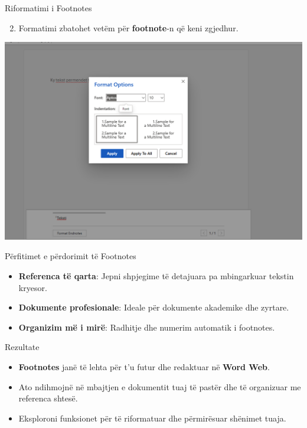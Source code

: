 \documentclass[
  ignorenonframetext,
]{beamer}
\providecommand{\tightlist}{%
  \setlength{\itemsep}{0pt}\setlength{\parskip}{0pt}}
\begin{document}
\begin{frame}{Riformatimi i Footnotes}
\label{riformatimi-i-footnotes-1}
\begin{enumerate}
\setcounter{enumi}{1}
\tightlist
\item
  Formatimi zbatohet vetëm për \textbf{footnote}-n që keni zgjedhur.
\end{enumerate}

\includegraphics{./images/word15.png}
\end{frame}

\begin{frame}{Përfitimet e përdorimit të Footnotes}
\label{puxebrfitimet-e-puxebrdorimit-tuxeb-footnotes}
\begin{itemize}
\item
  \textbf{Referenca të qarta}: Jepni shpjegime të detajuara pa
  mbingarkuar tekstin kryesor.
\item
  \textbf{Dokumente profesionale}: Ideale për dokumente akademike dhe
  zyrtare.
\item
  \textbf{Organizim më i mirë}: Radhitje dhe numerim automatik i
  footnotes.
\end{itemize}
\end{frame}

\begin{frame}{Rezultate}
\label{rezultate-2}
\begin{itemize}
\item
  \textbf{Footnotes} janë të lehta për t'u futur dhe redaktuar në
  \textbf{Word Web}.
\item
  Ato ndihmojnë në mbajtjen e dokumentit tuaj të pastër dhe të
  organizuar me referenca shtesë.
\item
  Eksploroni funksionet për të riformatuar dhe përmirësuar shënimet
  tuaja.
\end{itemize}
\end{frame}
\end{document}
